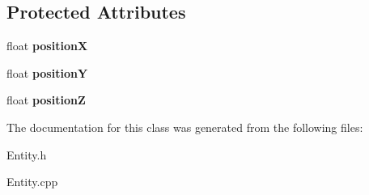 \subsection*{Protected Attributes}
\begin{DoxyCompactItemize}
\item 
\hypertarget{class_entity_a7c0dee96eec0195e0d044431407b6324}{float {\bfseries position\-X}}\label{class_entity_a7c0dee96eec0195e0d044431407b6324}

\item 
\hypertarget{class_entity_afe0759b6ac8aeb85d8beb9292241f769}{float {\bfseries position\-Y}}\label{class_entity_afe0759b6ac8aeb85d8beb9292241f769}

\item 
\hypertarget{class_entity_a70f4db98655aeb2bb3a9ec9dea07db3e}{float {\bfseries position\-Z}}\label{class_entity_a70f4db98655aeb2bb3a9ec9dea07db3e}

\end{DoxyCompactItemize}


The documentation for this class was generated from the following files\-:\begin{DoxyCompactItemize}
\item 
Entity.\-h\item 
Entity.\-cpp\end{DoxyCompactItemize}
